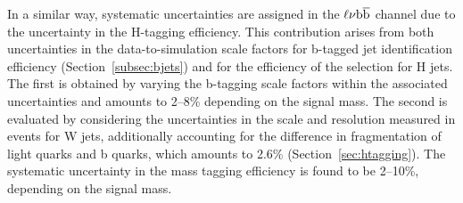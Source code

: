 In a similar way, systematic uncertainties are assigned in the $\ell\nu{\mathrm{b}\overline{\mathrm{b}}}$ channel due to the uncertainty in the H-tagging efficiency.
This contribution arises from both uncertainties in the data-to-simulation scale factors for b-tagged jet identification efficiency (Section~\ref{subsec:bjets})
and for the efficiency of the \mJ selection for H jets.
The first is obtained by varying the b-tagging scale factors within the associated uncertainties and amounts to 2--8\% depending on the signal mass.
The second is evaluated by considering the uncertainties in the \mJ scale and resolution measured in \ttbar events for W jets,
additionally accounting for the difference in fragmentation of light quarks and b quarks, which amounts to 2.6\% (Section~\ref{sec:htagging}).
The systematic uncertainty in the mass tagging efficiency is found to be 2--10\%, depending on the signal mass.

